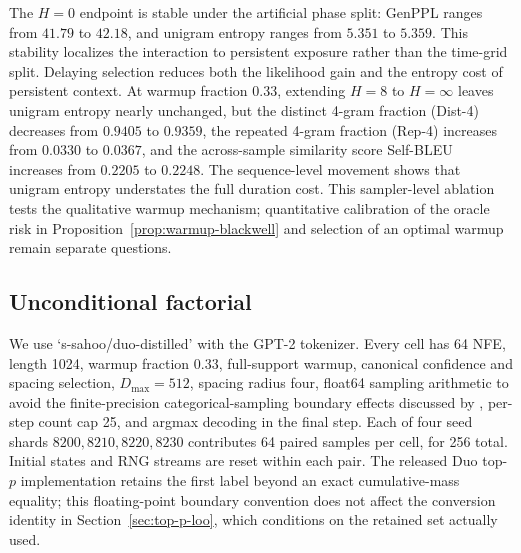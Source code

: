 \documentclass{article}
\newcommand{\1}{\mathbf 1}
\theoremstyle{definition}
\begin{document}
The $H=0$ endpoint is stable under the artificial phase split: GenPPL ranges
from $41.79$ to $42.18$, and unigram entropy ranges from $5.351$ to $5.359$.
This stability localizes the interaction to persistent exposure rather than
the time-grid split.
Delaying selection reduces both the likelihood gain and the entropy cost of
persistent context. At warmup fraction $0.33$, extending $H=8$ to $H=\infty$
leaves unigram entropy nearly unchanged, but the distinct 4-gram
fraction (Dist-4)~\citep{li2016diversity} decreases from $0.9405$ to $0.9359$, the repeated 4-gram
fraction (Rep-4) increases from
$0.0330$ to $0.0367$, and the across-sample similarity score
Self-BLEU~\citep{papineni2002bleu,zhu2018texygen}
increases from $0.2205$ to $0.2248$. The sequence-level movement
shows that unigram entropy understates the full duration cost. This
sampler-level ablation tests the qualitative warmup mechanism; quantitative
calibration of the oracle risk in Proposition~\ref{prop:warmup-blackwell} and
selection of an optimal warmup remain separate questions.

\subsection{Unconditional factorial}

We use `s-sahoo/duo-distilled' with the GPT-2 tokenizer. Every cell has 64 NFE,
length 1024, warmup fraction $0.33$, full-support warmup, canonical confidence
and spacing selection, $D_{\max}=512$, spacing radius four, float64 sampling
arithmetic to avoid the finite-precision categorical-sampling boundary effects
discussed by \citet{zheng2025secretly}, per-step count cap 25, and argmax decoding in the final step. Each of four seed shards
$8200,8210,8220,8230$ contributes 64 paired samples per cell, for 256 total. Initial states
and RNG streams are reset within each pair.
The released Duo top-$p$ implementation retains the first label beyond an
exact cumulative-mass equality; this floating-point boundary convention does
not affect the conversion identity in Section~\ref{sec:top-p-loo},
which conditions on the retained set actually used.
\end{document}

